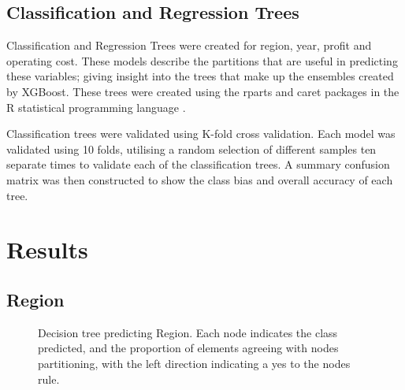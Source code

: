 \documentclass[review,12pt,authoryear]{elsarticle}
\begin{document}
\begin{linenumbers}
\subsection{Classification and Regression Trees}

Classification and Regression Trees were created for region, year, profit and operating cost. These models describe the partitions that are useful in predicting these variables; giving insight into the trees that make up the ensembles created by XGBoost. These trees were created using the rparts and caret packages \citep{kuhnBuildingPredictiveModels2008,terrytherneauRpartRecursivePartitioning2022} in the R statistical programming language \citep{rcoreteamLanguageEnvironmentStatistical2021}.
\par
Classification trees were validated using K-fold cross validation. Each model was validated using 10 folds, utilising a random selection of different samples ten separate times to validate each of the  classification trees. A summary confusion matrix was then constructed to show the class bias and overall accuracy of each tree.

\section{Results}


\subsection{Region}

\begin{figure}
  \caption{Decision tree predicting Region. Each node indicates the class predicted, and the proportion of elements agreeing with nodes partitioning, with the left direction indicating a yes to the nodes rule.}\label{fig:region_tree}
\end{figure}


\end{linenumbers}
\end{document}
